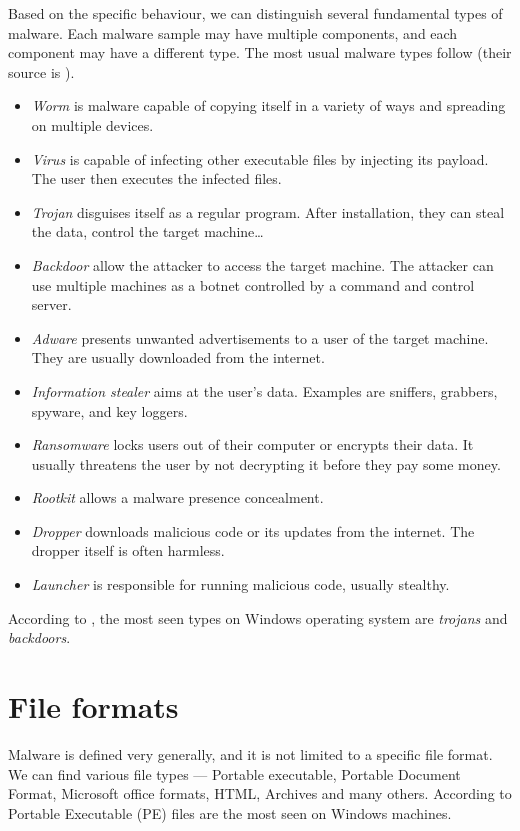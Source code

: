 Based on the specific behaviour, we can distinguish several fundamental types of malware. Each malware sample may have multiple components, and each component may have a different type. The most usual malware types follow (their source is \cite{Cole2009, KA2018, Graham2010, Sikorski2012}).
\begin{itemize}
  \itemsep0em 
  \item \emph{Worm} is malware capable of copying itself in a variety of ways and spreading on multiple devices.
  \item \emph{Virus} is capable of infecting other executable files by injecting its payload. The user then executes the infected files.
  \item \emph{Trojan} disguises itself as a regular program. After installation, they can steal the data, control the target machine\dots
  \item \emph{Backdoor} allow the attacker to access the target machine. The attacker can use multiple machines as a botnet controlled by a command and control server.
  \item \emph{Adware} presents unwanted advertisements to a user of the target machine. They are usually downloaded from the internet.
  \item \emph{Information stealer} aims at the user's data. Examples are sniffers, grabbers, spyware, and key loggers.
  \item \emph{Ransomware} locks users out of their computer or encrypts their data. It usually threatens the user by not decrypting it before they pay some money.
  \item \emph{Rootkit} allows a malware presence concealment.
  \item \emph{Dropper} downloads malicious code or its updates from the internet. The dropper itself is often harmless.
  \item \emph{Launcher} is responsible for running malicious code, usually stealthy.
\end{itemize}

According to \cite{AVATLASM39:online}, the most seen types on Windows operating system are \emph{trojans} and \emph{backdoors}.

\section{File formats}
Malware is defined very generally, and it is not limited to a specific file format. We can find various file types --- Portable executable, Portable Document Format, Microsoft office formats, HTML, Archives and many others. According to \cite{AVATLASM39:online} Portable Executable (PE) files are the most seen on Windows machines.

